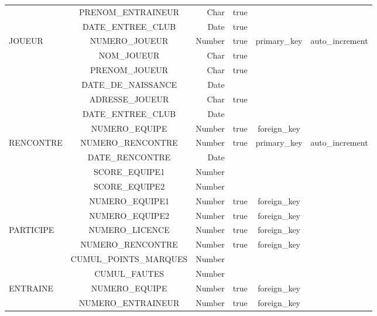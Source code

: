 \begin{center}
\begin{tabular}{|l|c|r|c|c|c|}
    \cline{2-6}
    & PRENOM\_ENTRAINEUR & Char & true & & \\
    \cline{2-6}
    & DATE\_ENTREE\_CLUB & Date & true & & \\
    \hline
    \hline
    JOUEUR & NUMERO\_JOUEUR & Number & true & primary\_key & auto\_increment\\
    \cline{2-6}
    & NOM\_JOUEUR & Char & true &  & \\
    \cline{2-6}
    & PRENOM\_JOUEUR & Char & true & & \\
    \cline{2-6}
    & DATE\_DE\_NAISSANCE & Date & & & \\
    \cline{2-6}
    & ADRESSE\_JOUEUR & Char & true &  & \\
    \cline{2-6}
    & DATE\_ENTREE\_CLUB & Date & & & \\
     \cline{2-6}
    & NUMERO\_EQUIPE & Number & true & foreign\_key & \\
    \hline
    \hline
    RENCONTRE & NUMERO\_RENCONTRE& Number & true & primary\_key & auto\_increment\\
    \cline{2-6}
    & DATE\_RENCONTRE & Date &  &  & \\
    \cline{2-6}
    & SCORE\_EQUIPE1 & Number &  & & \\
    \cline{2-6}
    & SCORE\_EQUIPE2 & Number &  & & \\
    \cline{2-6}
    & NUMERO\_EQUIPE1 & Number & true &  foreign\_key& \\
    \cline{2-6}
    & NUMERO\_EQUIPE2 & Number & true &  foreign\_key& \\
    \hline
    \hline
    PARTICIPE & NUMERO\_LICENCE & Number & true & foreign\_key & \\
    \cline{2-6}
    & NUMERO\_RENCONTRE & Number & true & foreign\_key & \\
    \cline{2-6}
    & CUMUL\_POINTS\_MARQUES & Number & & & \\
    \cline{2-6}
    & CUMUL\_FAUTES & Number & & & \\
    \hline
    \hline
    ENTRAINE & NUMERO\_EQUIPE & Number & true & foreign\_key & \\
    \cline{2-6}
    & NUMERO\_ENTRAINEUR & Number & true & foreign\_key & \\
    \hline
   
\end{tabular} 
\end{center}